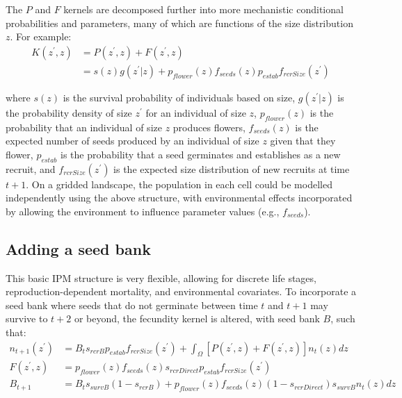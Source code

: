 \documentclass[]{article}
\begin{document}
The \(P\) and \(F\) kernels are decomposed further into more mechanistic
conditional probabilities and parameters, many of which are functions of
the size distribution \(z\). For example: \begin{equation}
\begin{split}
K(z^{\prime}, z) & = P(z^{\prime}, z) + F(z^{\prime}, z) \\
    & = s(z) g(z^{\prime}|z) + p_{flower}(z) f_{seeds}(z) p_{estab} f_{rcrSize}(z^{\prime})
\end{split}
\end{equation}

where \(s(z)\) is the survival probability of individuals based on size,
\(g(z^{\prime}|z)\) is the probability density of size \(z^{\prime}\)
for an individual of size \(z\), \(p_{flower}(z)\) is the probability
that an individual of size \(z\) produces flowers, \(f_{seeds}(z)\) is
the expected number of seeds produced by an individual of size \(z\)
given that they flower, \(p_{estab}\) is the probability that a seed
germinates and establishes as a new recruit, and
\(f_{rcrSize}(z^{\prime})\) is the expected size distribution of new
recruits at time \(t+1\). On a gridded landscape, the population in each
cell could be modelled independently using the above structure, with
environmental effects incorporated by allowing the environment to
influence parameter values (e.g., \(f_{seeds}\)).

\subsection{Adding a seed bank}

This basic IPM structure is very flexible, allowing for discrete life
stages, reproduction-dependent mortality, and environmental covariates.
To incorporate a seed bank where seeds that do not germinate between
time \(t\) and \(t+1\) may survive to \(t+2\) or beyond, the fecundity
kernel is altered, with seed bank \(B\), such that: \begin{align}
n_{t+1}(z^{\prime}) &= B_t s_{rcrB} p_{estab} f_{rcrSize}(z^{\prime}) + \int_{\Omega}[P(z^{\prime}, z)+F(z^{\prime}, z)] n_t(z) dz \\
F(z^{\prime}, z) &= p_{flower}(z)  f_{seeds}(z) s_{rcrDirect} p_{estab} f_{rcrSize}(z^{\prime}) \\
B_{t+1} &= B_t s_{survB} (1-s_{rcrB})  + p_{flower}(z)  f_{seeds}(z) (1-s_{rcrDirect}) s_{survB} n_t(z) dz
\end{align}
\end{document}
